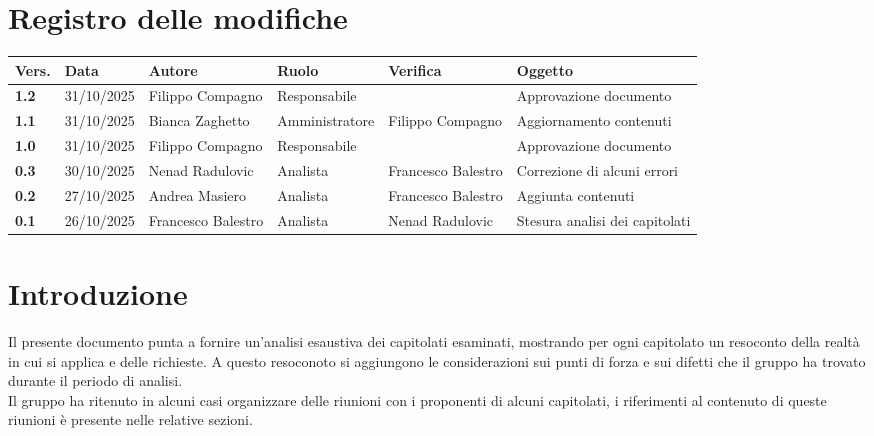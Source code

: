 \documentclass[a4paper,12pt]{article}
\begin{document}
    

    \newpage
    \section*{Registro delle modifiche} {
    \begin{table}[h!]
        \begin{tabularx}{\textwidth}{|l|l|l|l|L|L|}
        \hline
        \textbf{Vers.} & \textbf{Data} & \textbf{Autore} & \textbf{Ruolo} & \textbf{Verifica} & \textbf{Oggetto} \\
        \hline
        \textbf{1.2} & 31/10/2025 & Filippo Compagno & Responsabile &  & Approvazione documento \\
        \textbf{1.1} & 31/10/2025 & Bianca Zaghetto & Amministratore & Filippo Compagno & Aggiornamento contenuti \\
        \textbf{1.0} & 31/10/2025 & Filippo Compagno & Responsabile & & Approvazione documento \\
        \textbf{0.3} & 30/10/2025 & Nenad Radulovic & Analista & Francesco Balestro & Correzione di alcuni errori \\
        \textbf{0.2} & 27/10/2025 & Andrea Masiero & Analista & Francesco Balestro & Aggiunta contenuti \\
        \textbf{0.1} & 26/10/2025 & Francesco Balestro & Analista & Nenad Radulovic & Stesura analisi dei capitolati \\
        \hline
        \end{tabularx}
        \end{table}
    }
    \newpage

    \tableofcontents
    \newpage

    \section{Introduzione}
    Il presente documento punta a fornire un'analisi esaustiva dei capitolati esaminati, mostrando per ogni capitolato un resoconto della realtà in cui si applica e delle richieste. A questo resoconoto si aggiungono le considerazioni sui punti di forza e sui difetti che il gruppo ha trovato durante il periodo di analisi. \\ Il gruppo ha ritenuto in alcuni casi organizzare delle riunioni con i proponenti di alcuni capitolati, i riferimenti al contenuto di queste riunioni è presente nelle relative sezioni.
\end{document}
